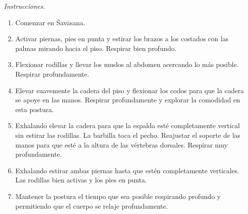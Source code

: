 \emph{Instrucciones.}
\begin{enumerate}
\item Comenzar en Śavāsana.
\item Activar piernas, pies en punta y
estirar los brazos a los costados con las
palmas mirando hacia el piso. Respirar bien
profundo.
\item Flexionar rodillas y llevar los muslos
al abdomen acercando lo más posible. Respirar
profundamente.
\item Elevar suavemente la cadera del piso y
flexionar los codos para que la cadera se
apoye en las manos. Respirar profundamente y
explorar la comodidad en esta postura.
\item Exhalando elevar la cadera para que la
espalda esté completamente vertical sin
estirar las rodillas. La barbilla toca el
pecho. Reajustar el soporte de las manos para
que esté a la altura de las vértebras
dorsales. Respirar muy profundamente.
\item Exhalando estirar ambas piernas hasta
que estén completamente verticales. Las
rodillas bien activas y los pies en punta.
\item Mantener la postura el tiempo que sea
posible respirando profundo y permitiendo que
el cuerpo se relaje profundamente.
\end{enumerate}

